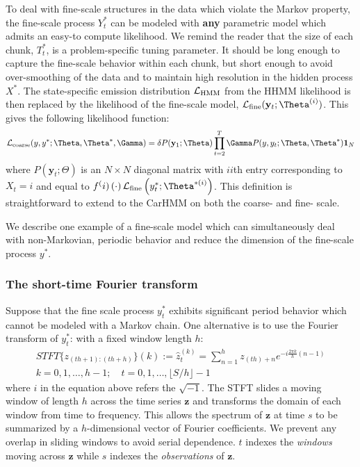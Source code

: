 To deal with fine-scale structures in the data which violate the Markov property, the fine-scale process $Y^*_t$ can be modeled with \textbf{any} parametric model which admits an easy-to compute likelihood. We remind the reader that the size of each chunk, $T^*_t$, is a problem-specific tuning parameter. It should be long enough to capture the fine-scale behavior within each chunk, but short enough to avoid over-smoothing of the data and to maintain high resolution in the hidden process $X^*$. The state-specific emission distribution $\mathcal{L}_{\text{HMM}}$ from the HHMM likelihood is then replaced by the likelihood of the fine-scale model, $\calL_{\text{fine}}(\mathbf{y}_t;\Theta^{(i)})$. This gives the following likelihood function:
\[
\calL_{\text{coarse}}(y,y^*;\Theta,\Theta^*,\Gamma) = \delta P(\mathbf{y}_1;\Theta) \prod_{t=2}^T \Gamma P(y,y_t;\Theta,\Theta^*) \mathbf{1}_N
\]
where $P(\mathbf{y}_t;\Theta)$ is an $N \times N$ diagonal matrix with $ii$th entry corresponding to $X_t=i$ and equal to $f^(i)\left(\cdot\right)\calL_{\text{fine}}\left(y^*_t;\Theta^{*(i)}\right)$. This definition is straightforward to extend to the CarHMM on both the coarse- and fine- scale.

We describe one example of a fine-scale model which can simultaneously deal with non-Markovian, periodic behavior and reduce the dimension of the fine-scale process $y^*$.

\subsubsection{The short-time Fourier transform}

Suppose that the fine scale process $y^*_t$ exhibits significant period behavior which cannot be modeled with a Markov chain. One alternative is to use the Fourier transform of $y^*_t$: with a fixed window length $h$:
%
\begin{align*}
    STFT\{z_{(th+1):(th+h)}\}(k) := \hat{z}^{(k)}_{t} = \sum_{n = 1}^{h} z_{(th)+n}e^{-i \frac{2\pi k}{h} (n-1)} \\ k = 0, 1, \ldots, h-1; \quad t = 0,1, \ldots, \lfloor S/h \rfloor - 1
\end{align*}
%
where $i$ in the equation above refers the $\sqrt{-1}$. The STFT slides a moving window of length $h$ across the time series $\mathbf{z}$ and transforms the domain of each window from time to frequency. This allows the spectrum of $\mathbf{z}$ at time $s$ to be summarized by a $h$-dimensional vector of Fourier coefficients. We prevent any overlap in sliding windows to avoid serial dependence. $t$ indexes the \textit{windows} moving across $\mathbf{z}$ while $s$ indexes the \textit{observations} of $\mathbf{z}$. 

